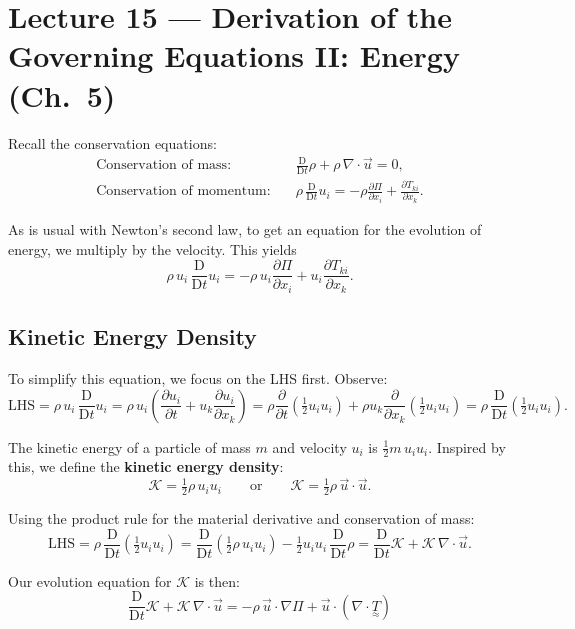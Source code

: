 \documentclass[11pt,a4paper]{article}
\newcommand{\D}{\mathrm{D}}
\newcommand{\Dt}{\frac{\D}{\D t}}
\newcommand{\pdt}[1]{\frac{\partial #1}{\partial t}}
\newcommand{\pdx}[2]{\frac{\partial #1}{\partial #2}}
\newcommand{\uv}{\vec{u}}
\newcommand{\tens}[1]{\underset{\approx}{#1}}
\begin{document}
\section{Lecture 15 --- Derivation of the Governing Equations II: Energy (Ch.\ 5)}

Recall the conservation equations:
\begin{align}
    \text{Conservation of mass:} & \quad \Dt\rho + \rho\,\nabla\cdot\uv = 0, \label{eq:mass}\\
    \text{Conservation of momentum:} & \quad \rho\,\Dt u_i = -\rho\pdx{\Pi}{x_i} + \pdx{T_{ki}}{x_k}. \label{eq:mom}
\end{align}

As is usual with Newton's second law, to get an equation for the evolution of energy, we multiply by the velocity. This yields
\[
    \rho\, u_i\, \Dt u_i = -\rho\, u_i\pdx{\Pi}{x_i} + u_i\pdx{T_{ki}}{x_k}.
\]

\subsection{Kinetic Energy Density}

To simplify this equation, we focus on the LHS first. Observe:
\[
    \text{LHS} = \rho\, u_i\,\Dt u_i = \rho\, u_i\left(\pdt{u_i} + u_k\pdx{u_i}{x_k}\right)
    = \rho\pdt{}\!\left(\tfrac{1}{2}u_i u_i\right) + \rho u_k\pdx{}{x_k}\!\left(\tfrac{1}{2}u_i u_i\right)
    = \rho\,\Dt\!\left(\tfrac{1}{2}u_i u_i\right).
\]

The kinetic energy of a particle of mass $m$ and velocity $u_i$ is $\tfrac{1}{2}m\,u_i u_i$. Inspired by this, we define the \textbf{kinetic energy density}:
\[
    \boxed{\mathcal{K} = \tfrac{1}{2}\rho\, u_i u_i}
    \qquad \text{or} \qquad
    \boxed{\mathcal{K} = \tfrac{1}{2}\rho\,\uv\cdot\uv.}
\]

Using the product rule for the material derivative and conservation of mass:
\[
    \text{LHS} = \rho\,\Dt\!\left(\tfrac{1}{2}u_i u_i\right) = \Dt\!\left(\tfrac{1}{2}\rho\, u_i u_i\right) - \tfrac{1}{2}u_i u_i\,\Dt\rho
    = \Dt\mathcal{K} + \mathcal{K}\,\nabla\cdot\uv.
\]

Our evolution equation for $\mathcal{K}$ is then:
\[
    \boxed{\Dt\mathcal{K} + \mathcal{K}\,\nabla\cdot\uv = -\rho\,\uv\cdot\nabla\Pi + \uv\cdot(\nabla\cdot\tens{T})}
    \tag{$\star$}
\]
\end{document}
